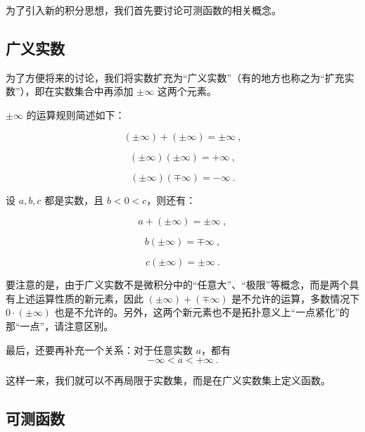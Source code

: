 
为了引入新的积分思想，我们首先要讨论可测函数的相关概念。

\subsection{广义实数}

为了方便将来的讨论，我们将实数扩充为“广义实数”（有的地方也称之为“扩充实数”），即在实数集合中再添加 $\pm\infty$ 这两个元素。

$\pm\infty$ 的运算规则简述如下：

\begin{equation}
(\pm\infty)+( \pm \infty)=\pm \infty~,
\end{equation}

\begin{equation}
(\pm\infty)(\pm\infty)=+\infty~,
\end{equation}

\begin{equation}
(\pm\infty)(\mp\infty)=-\infty~.
\end{equation}

设 $a, b, c$ 都是实数，且 $b<0<c$，则还有：

\begin{equation}
a+(\pm\infty)=\pm\infty~,
\end{equation}

\begin{equation}
b(\pm\infty)=\mp\infty~,
\end{equation}

\begin{equation}
c(\pm\infty)=\pm\infty~.
\end{equation}

要注意的是，由于广义实数不是微积分中的“任意大”、“极限”等概念，而是两个具有上述运算性质的新元素，因此 $(\pm\infty)+(\mp\infty)$ 是不允许的运算，多数情况下 $0\cdot(\pm\infty)$ 也是不允许的。另外，这两个新元素也不是拓扑意义上“一点紧化”的那“一点”，请注意区别。

最后，还要再补充一个关系：对于任意实数 $a$，都有
\begin{equation}
-\infty<a<+\infty~.
\end{equation}


这样一来，我们就可以不再局限于实数集，而是在广义实数集上定义函数。



\subsection{可测函数}

